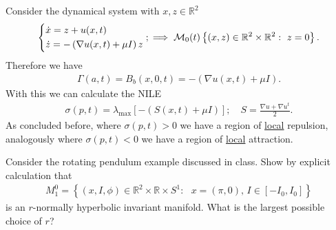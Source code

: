 \begin{ex}
	Consider the dynamical system with $x,z\in \mathbb{R}^{2}$
	\begin{align}
		\begin{dcases}
			\dot{x} = z + u(x,t) \\
			\dot{z} = - \left( \nabla u(x,t) + \mu I \right) z
		\end{dcases}
		; \implies \mathcal{M}_{0}(t) \left\{ (x,z) \in \mathbb{R}^{2}\times \mathbb{R}^{2}:\ z =0\right\}.	
	\end{align}
Therefore we have 
\begin{align}
	\Gamma(a,t) = B_{b}(x,0,t) = - \left(\nabla u(x,t) + \mu I \right).
\end{align}
With this we can calculate the NILE
\begin{align}
	\sigma(p,t) = \lambda _{ \textrm{max} } \left[ - (S(x,t) + \mu I ) \right]; \quad S = \frac{\nabla u + \nabla u^{t}}{2}.
\end{align}
As concluded before, where $\sigma(p,t)>0$ we have a region of \underline{local} repulsion, analogously where $\sigma(p,t) <0$ we have a region of \underline{local} attraction.
\end{ex}

\begin{exercise}
Consider the rotating pendulum example discussed in class. Show by explicit calculation that 
\begin{align}
M_{1}^{0}=\left\{ \left({x},I,\phi\right)\in\mathbb{R}^{2}\times\mathbb{R}\times S^{1}: \,\,\,\,{x}=\left(\pi,0\right),\,I\in\left[-I_{0},I_{0}\right]\right\} 
\end{align}
is an $r$-normally hyperbolic invariant manifold. What is the largest possible choice of $r$?
\end{exercise}

